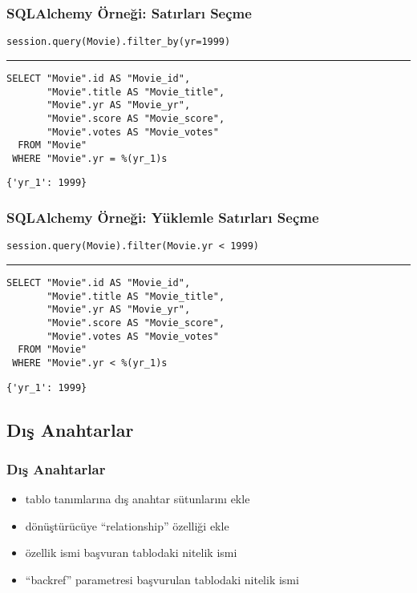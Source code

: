 \documentclass[dvipsnames]{beamer}
\theoremstyle{plain}
\begin{document}
\begin{frame}[fragile]
  \frametitle{SQLAlchemy Örneği: Satırları Seçme}

  \begin{lstlisting}
session.query(Movie).filter_by(yr=1999)
  \end{lstlisting}
  \hrule

  \begin{lstlisting}[language=FullSQL]
SELECT "Movie".id AS "Movie_id",
       "Movie".title AS "Movie_title",
       "Movie".yr AS "Movie_yr",
       "Movie".score AS "Movie_score",
       "Movie".votes AS "Movie_votes"
  FROM "Movie"
 WHERE "Movie".yr = %(yr_1)s
  \end{lstlisting}

  \begin{lstlisting}
{'yr_1': 1999}
  \end{lstlisting}
\end{frame}

\begin{frame}[fragile]
  \frametitle{SQLAlchemy Örneği: Yüklemle Satırları Seçme}

  \begin{lstlisting}
session.query(Movie).filter(Movie.yr < 1999)
  \end{lstlisting}
  \hrule

  \begin{lstlisting}[language=FullSQL]
SELECT "Movie".id AS "Movie_id",
       "Movie".title AS "Movie_title",
       "Movie".yr AS "Movie_yr",
       "Movie".score AS "Movie_score",
       "Movie".votes AS "Movie_votes"
  FROM "Movie"
 WHERE "Movie".yr < %(yr_1)s
  \end{lstlisting}

  \begin{lstlisting}
{'yr_1': 1999}
  \end{lstlisting}
\end{frame}

\subsection{Dış Anahtarlar}

\begin{frame}
  \frametitle{Dış Anahtarlar}

  \begin{itemize}
    \item tablo tanımlarına dış anahtar sütunlarını ekle
    \item dönüştürücüye ``relationship'' özelliği ekle
    \item özellik ismi başvuran tablodaki nitelik ismi
    \item ``backref'' parametresi başvurulan tablodaki nitelik ismi
  \end{itemize}
\end{frame}
\end{document}
